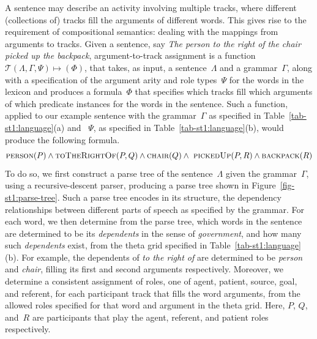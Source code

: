 A sentence may describe an activity involving multiple tracks, where different
(collections of) tracks fill the arguments of different words.
%
This gives rise to the requirement of compositional semantics: dealing with the
mappings from arguments to tracks.
%
Given a sentence, say \emph{The person to the right of the chair picked up the
  backpack}, argument-to-track assignment is a function
$\mathcal{T}(\Lambda,\Gamma,\Psi)\mapsto(\Phi)$, that takes, as input, a
sentence~$\Lambda$ and a grammar~$\Gamma$, along with a specification of the
argument arity and role types~$\Psi$ for the words in the lexicon and produces
a formula~$\Phi$ that specifies which tracks fill which arguments of which
predicate instances for the words in the sentence.
%
Such a function, applied to our example sentence with the grammar~$\Gamma$ as
specified in Table~\ref{tab-st1:language}(a) and ~$\Psi$, as
specified in Table~\ref{tab-st1:language}(b), would produce the following formula.
%
\begin{equation*}
  \textsc{person}(P) \wedge
  \textsc{toTheRightOf}(P,Q)\wedge
  \textsc{chair}(Q)\wedge\
  \textsc{pickedUp}(P,R)\wedge
  \textsc{backpack}(R)
\end{equation*}
%
To do so, we first construct a parse tree of the sentence~$\Lambda$ given the
grammar~$\Gamma$, using a recursive-descent parser, producing
a parse tree shown in Figure~\ref{fig-st1:parse-tree}.
%
Such a parse tree encodes in its structure, the dependency relationships
between different parts of speech as specified by the grammar.
%
For each word, we then determine from the parse tree, which words in the
sentence are determined to be its \textsl{dependents} in the sense of
\textsl{government}, and how many such \textsl{dependents} exist, from the
theta grid specified in Table~\ref{tab-st1:language}(b).
%
For example, the dependents of \emph{to the right of} are determined to be
\emph{person} and \emph{chair}, filling its first and second arguments
respectively.
%
Moreover, we determine a consistent assignment of roles, one of agent,
patient, source, goal, and referent, for each participant track that fills the
word arguments, from the allowed roles specified for that word
and argument in the theta grid.
%
Here, $P$, $Q$, and~$R$ are participants that play the agent, referent, and
patient roles respectively.

